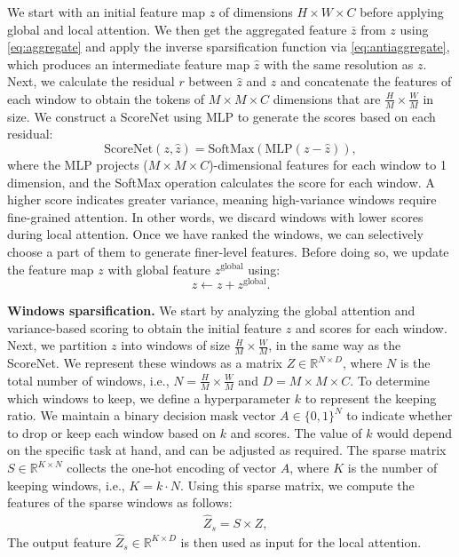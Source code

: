 We start with an initial feature map $z$ of dimensions $H \times W \times C$ before applying global and local attention. We then get the aggregated feature $\bar{z}$ from $z$ using \cref{eq:aggregate} and apply the inverse sparsification function via \cref{eq:antiaggregate}, which produces an intermediate feature map $\hat{z}$ with the same resolution as $z$. Next, we calculate the residual $r$ between $\hat{z}$ and $z$ and concatenate the features of each window to obtain the tokens of $M\times M\times C$ dimensions that are $\frac{H}{M}\times \frac{W}{M}$ in size. 
We construct a ScoreNet using MLP to generate the scores based on each residual: 
\begin{equation}
\text{ScoreNet}(z, \hat{z}) = \text{SoftMax}(\text{MLP}(z - \hat{z})),
\label{eq:variance}
\end{equation}
where the MLP projects ($M\times M\times C$)-dimensional features for each window to 1 dimension, and the SoftMax operation calculates the score for each window. A higher score indicates greater variance, meaning high-variance windows
require fine-grained attention. In other words, we discard windows with lower scores during local attention.
Once we have ranked the windows, we can selectively choose a part of them to generate finer-level features. Before doing so, we update the feature map $z$ with global feature $z^{\text{global}}$ using: 
\begin{equation}
z \gets  z + z^{\text{global}}.
\label{eq:update_gloabl}
\end{equation}


\vspace{2mm}\noindent\textbf{Windows sparsification.}
We start by analyzing the global attention and variance-based scoring to obtain the initial feature $z$ and scores for each window. Next, we partition $z$ into windows of size $\frac{H}{M}\times \frac{W}{M}$, in the same way as the ScoreNet. We represent these windows as a matrix $Z\in \mathbb{R}^{N\times D}$, where $N$ is the total number of windows, i.e., $N=\frac{H}{M}\times \frac{W}{M}$ and $D=M\times M\times C$.
%
To determine which windows to keep, we define a hyperparameter $k$ to represent the keeping ratio. We maintain a binary decision mask vector $A\in \{0, 1\}^N$ to indicate whether to drop or keep each window based on $k$ and scores. The value of $k$ would depend on the specific task at hand, and can be adjusted as required.
%
The sparse matrix $S\in \mathbb{R}^{K\times N}$ collects the one-hot encoding of vector $A$, where $K$ is the number of keeping windows, i.e., $K=k\cdot N$. Using this sparse matrix, we compute the features of the sparse windows as follows:
\begin{equation}
\begin{split}
    &  \hat{Z}_{s} = S \times Z,
\end{split}
\end{equation}
%
The output feature $\hat{Z}_{s} \in \mathbb{R}^{K\times D}$ is then used as input for the local attention.

